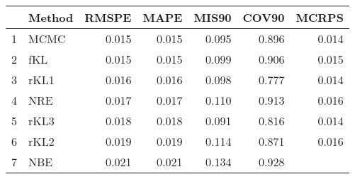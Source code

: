\documentclass[12pt]{article}
\begin{document}
\thispagestyle{empty}
\begin{table}[ht]
\centering
\begin{tabular}{rlrrrrr}
  \hline
 & Method & RMSPE & MAPE & MIS90 & COV90 & MCRPS \\ 
  \hline
1 & MCMC & 0.015 & 0.015 & 0.095 & 0.896 & 0.014 \\ 
  2 & fKL & 0.015 & 0.015 & 0.099 & 0.906 & 0.015 \\ 
  3 & rKL1 & 0.016 & 0.016 & 0.098 & 0.777 & 0.014 \\ 
  4 & NRE & 0.017 & 0.017 & 0.110 & 0.913 & 0.016 \\ 
  5 & rKL3 & 0.018 & 0.018 & 0.091 & 0.816 & 0.014 \\ 
  6 & rKL2 & 0.019 & 0.019 & 0.114 & 0.871 & 0.016 \\ 
  7 & NBE & 0.021 & 0.021 & 0.134 & 0.928 &  \\ 
   \hline
\end{tabular}
\end{table}
\end{document}
